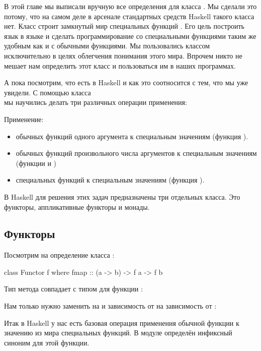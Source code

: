 В этой главе мы выписали вручную все определения для класса
. Мы сделали это потому, что на самом деле в арсенале
стандартных средств Haskell такого класса нет. Класс  строит
замкнутый мир специальных функций . Его цель построить язык
в языке и сделать программирование со специальными функциями таким же
удобным как и с обычными функциями. Мы пользовались классом 
исключительно в целях облегчения понимания этого мира. Впрочем никто не
мешает нам определить этот класс и пользоваться им в наших программах.

А пока посмотрим, что есть в Haskell и как это соотносится с тем, что мы
уже увидели. С помощью класса \\мы научились делать три
различных операции применения:

Применение:

\begin{itemize}
\item
  обычных функций одного аргумента к специальным значениям (функция
  \In{+$}).
\item
  обычных функций произвольного числа аргументов к специальным значениям
  (функции \In{+$} и \In{$$})
\item
  специальных функций к специальным значениям (функция \In{*$}).
\end{itemize}

В Haskell для решения этих задач предназначены три отдельных класса. Это
функторы, аппликативные функторы и монады.

\subsection{Функторы}

Посмотрим на определение класса 
:


\begin{code}
class Functor f where
    fmap :: (a -> b) -> f a -> f b
\end{code}

Тип метода  совпадает с типом для функции \In{+$}:



Нам только нужно заменить  на  и зависимость от 
на зависимость от :

Итак в Haskell у нас есть базовая операция  применения обычной
функции к значению из мира специальных функций. В модуле
 определён инфиксный синоним \In{<$>} для этой
функции.

